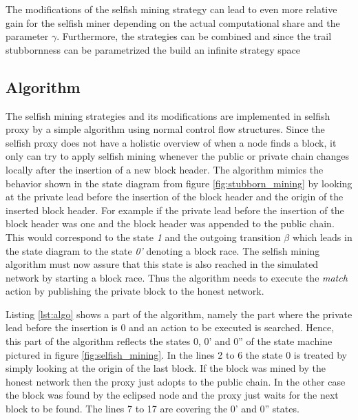The modifications of the selfish mining strategy can lead to even more relative gain for the selfish miner depending on the actual computational share and the parameter $\gamma$.
Furthermore, the strategies can be combined and since the trail stubbornness can be parametrized the build an infinite strategy space


\subsection{Algorithm}

The selfish mining strategies and its modifications are implemented in selfish proxy by a simple algorithm using normal control flow structures.
Since the selfish proxy does not have a holistic overview of when a node finds a block, it only can try to apply selfish mining whenever the public or private chain changes locally after the insertion of a new block header.
The algorithm mimics the behavior shown in the state diagram from figure \ref{fig:stubborn_mining} by looking at the private lead before the insertion of the block header and the origin of the inserted block header.
For example if the private lead before the insertion of the block header was one and the block header was appended to the public chain.
This would correspond to the state \textit{1} and the outgoing transition $\beta$ which leads in the state diagram to the state \textit{0'} denoting a block race.
The selfish mining algorithm must now assure that this state is also reached in the simulated network by starting a block race.
Thus the algorithm needs to execute the \textit{match} action by publishing the private block to the honest network.

Listing \ref{lst:algo} shows a part of the algorithm, namely the part where the private lead before the insertion is 0 and an action to be executed is searched.
Hence, this part of the algorithm reflects the states 0, 0' and 0'' of the state machine pictured in figure \ref{fig:selfish_mining}.
In the lines 2 to 6 the state 0 is treated by simply looking at the origin of the last block.
If the block was mined by the honest network then the proxy just adopts to the public chain.
In the other case the block was found by the eclipsed node and the proxy just waits for the next block to be found.
The lines 7 to 17 are covering the 0' and 0'' states.

